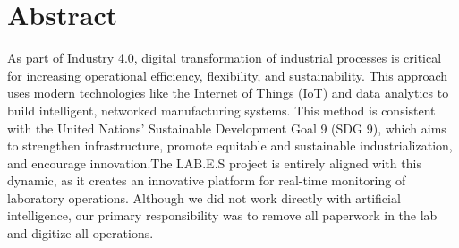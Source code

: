 \chapter*{Abstract}
As part of Industry 4.0, digital transformation of industrial processes is critical for increasing operational efficiency, flexibility, and sustainability. This approach uses modern technologies like the Internet of Things (IoT) and data analytics to build intelligent, networked manufacturing systems. This method is consistent with the United Nations' Sustainable Development Goal 9 (SDG 9), which aims to strengthen infrastructure, promote equitable and sustainable industrialization, and encourage innovation.The LAB.E.S project is entirely aligned with this dynamic, as it creates an innovative platform for real-time monitoring of laboratory operations. Although we did not work directly with artificial intelligence, our primary responsibility was to remove all paperwork in the lab and digitize all operations.


\vspace{2cm}



